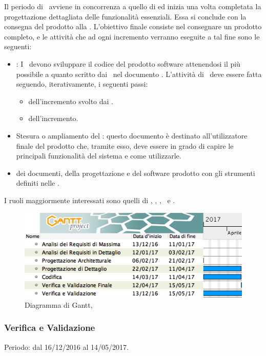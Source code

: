 Il periodo di \COD\ avviene in concorrenza a quello di \PD ed inizia una volta completata la progettazione dettagliata delle funzionalità essenziali. Essa si conclude con la consegna del prodotto alla \RQ. L'obiettivo finale consiste nel consegnare un prodotto completo, e le attività che ad ogni incremento verranno eseguite a tal fine sono le seguenti:
\begin{itemize}
	\item \COD: I \ProgrP\ devono sviluppare il codice del prodotto software attenendosi il più possibile a quanto scritto dai \ProgP\ nel documento \DDP. L'attività di \COD\ deve essere fatta seguendo, iterativamente, i seguenti passi:
			\begin{itemize}
				\item {} dell'incremento svolto dai \ProgP.
				\item {} dell'incremento.
			\end{itemize}
	\item Stesura o ampliamento del \MU: questo documento è destinato all'utilizzatore finale del prodotto che, tramite esso, deve essere in grado di capire le principali funzionalità del sistema e come utilizzarle.
	\item {} dei documenti, della progettazione e del software prodotto con gli strumenti definiti nelle \NdP.
\end{itemize}
I ruoli maggiormente interessati sono quelli di \Am, \Pm, \Prog, \Progr\ e \Ver.

 \begin{figure}[H]
	\centering 
	\includegraphics[scale=0.5]{Immagini/Gantt/COD.png}
	\caption{Diagramma di Gantt, \COD}
\end{figure}

\subsubsection{Verifica e Validazione}
Periodo: dal 16/12/2016 al 14/05/2017.\\

